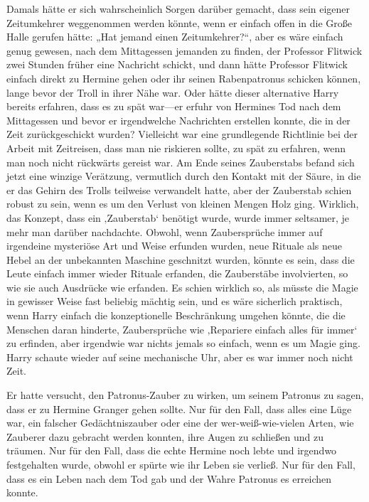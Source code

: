 Damals hätte er sich wahrscheinlich Sorgen darüber gemacht, dass sein eigener Zeitumkehrer weggenommen werden könnte, wenn er einfach offen in die Große Halle gerufen hätte: „Hat jemand einen Zeitumkehrer?“, aber es wäre einfach genug gewesen, nach dem Mittagessen jemanden zu finden, der Professor Flitwick zwei Stunden früher eine Nachricht schickt, und dann hätte Professor Flitwick einfach direkt zu Hermine gehen oder ihr seinen Rabenpatronus schicken können, lange bevor der Troll in ihrer Nähe war. Oder hätte dieser alternative Harry bereits erfahren, dass es zu spät war—er erfuhr von Hermines Tod nach dem Mittagessen und bevor er irgendwelche Nachrichten erstellen konnte, die in der Zeit zurückgeschickt wurden? Vielleicht war eine grundlegende Richtlinie bei der Arbeit mit Zeitreisen, dass man nie riskieren sollte, zu spät zu erfahren, wenn man noch nicht rückwärts gereist war.
Am Ende seines Zauberstabs befand sich jetzt eine winzige Verätzung, vermutlich durch den Kontakt mit der Säure, in die er das Gehirn des Trolls teilweise verwandelt hatte, aber der Zauberstab schien robust zu sein, wenn es um den Verlust von kleinen Mengen Holz ging. Wirklich, das Konzept, dass ein ‚Zauberstab‘ benötigt wurde, wurde immer seltsamer, je mehr man darüber nachdachte. Obwohl, wenn Zaubersprüche immer auf irgendeine mysteriöse Art und Weise erfunden wurden, neue Rituale als neue Hebel an der unbekannten Maschine geschnitzt wurden, könnte es sein, dass die Leute einfach immer wieder Rituale erfanden, die Zauberstäbe involvierten, so wie sie auch Ausdrücke wie  erfanden. Es schien wirklich so, als müsste die Magie in gewisser Weise fast beliebig mächtig sein, und es wäre sicherlich praktisch, wenn Harry einfach die konzeptionelle Beschränkung umgehen könnte, die die Menschen daran hinderte, Zaubersprüche wie ‚Repariere einfach alles für immer‘ zu erfinden, aber irgendwie war nichts jemals so einfach, wenn es um Magie ging.
Harry schaute wieder auf seine mechanische Uhr, aber es war immer noch nicht Zeit.

Er hatte versucht, den Patronus-Zauber zu wirken, um seinem Patronus zu sagen, dass er zu Hermine Granger gehen sollte. Nur für den Fall, dass alles eine Lüge war, ein falscher Gedächtniszauber oder eine der wer-weiß-wie-vielen Arten, wie Zauberer dazu gebracht werden konnten, ihre Augen zu schließen und zu träumen. Nur für den Fall, dass die echte Hermine noch lebte und irgendwo festgehalten wurde, obwohl er spürte wie ihr Leben sie verließ. Nur für den Fall, dass es ein Leben nach dem Tod gab und der Wahre Patronus es erreichen konnte.

